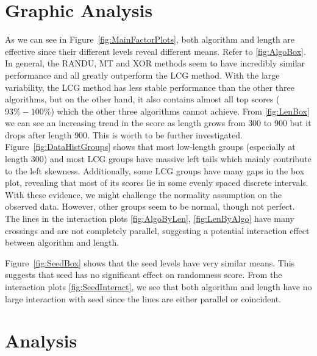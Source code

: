 \documentclass{report}
\begin{document}
\section{Graphic Analysis}
As we can see in Figure~\ref{fig:MainFactorPlots}, both algorithm and length are effective since their different levels reveal different means. Refer to \ref{fig:AlgoBox}. In general, the RANDU, MT and XOR methods seem to have incredibly similar performance and all greatly outperform the LCG method. With the large variability, the LCG method has less stable performance than the other three algorithms, but on the other hand, it also contains almost all top scores ($93\%-100\%$) which the other three algorithms cannot achieve. From \ref{fig:LenBox} we can see an increasing trend in the score as length grows from $300$ to $900$ but it drops after length $900$. This is worth to be further investigated. Figure~\ref{fig:DataHistGroups} shows that most low-length groups (especially at length 300) and most LCG groups have massive left tails which mainly contribute to the left skewness. Additionally, some LCG groups have many gaps in the box plot, revealing that most of its scores lie in some evenly spaced discrete intervals. With these evidence, we might challenge the normality assumption on the observed data. However, other groups seem to be normal, though not perfect. The lines in the interaction plots  \ref{fig:AlgoByLen}, \ref{fig:LenByAlgo} have many crossings and are not completely parallel, suggesting a potential interaction effect between algorithm and length.

Figure~\ref{fig:SeedBox} shows that the seed levels have very similar means. This suggests that seed has no significant effect on randomness score. From the interaction plots \ref{fig:SeedInteract}, we see that both algorithm and length have no large interaction with seed since the lines are either parallel or coincident.

\section{Analysis}
\end{document}
